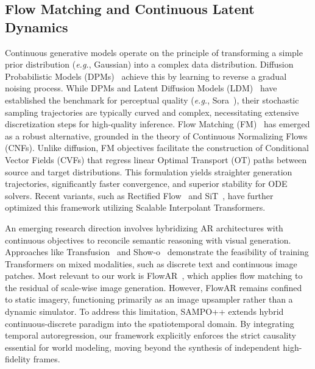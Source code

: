 \subsection{Flow Matching and Continuous Latent Dynamics}
Continuous generative models operate on the principle of transforming a simple prior distribution (\textit{e.g.}, Gaussian) into a complex data distribution. Diffusion Probabilistic Models (DPMs)~\cite{ho2020denoising, song2020score} achieve this by learning to reverse a gradual noising process. While DPMs and Latent Diffusion Models (LDM)~\cite{rombach2022high} have established the benchmark for perceptual quality (\textit{e.g.}, Sora~\cite{liu2024sora}), their stochastic sampling trajectories are typically curved and complex, necessitating extensive discretization steps for high-quality inference. Flow Matching (FM)~\cite{lipman2023flow, liuflow, albergo2025stochastic,wang2025flowram} has emerged as a robust alternative, grounded in the theory of Continuous Normalizing Flows (CNFs). Unlike diffusion, FM objectives facilitate the construction of Conditional Vector Fields (CVFs) that regress linear Optimal Transport (OT) paths between source and target distributions. This formulation yields straighter generation trajectories, significantly faster convergence, and superior stability for ODE solvers. Recent variants, such as Rectified Flow~\cite{liuflow} and SiT~\cite{ma2024sit}, have further optimized this framework utilizing Scalable Interpolant Transformers.

An emerging research direction involves hybridizing AR architectures with continuous objectives to reconcile semantic reasoning with visual generation. Approaches like Transfusion~\cite{zhou2024transfusion} and Show-o~\cite{xie2024show} demonstrate the feasibility of training Transformers on mixed modalities, such as discrete text and continuous image patches. Most relevant to our work is FlowAR~\cite{ren2024flowar}, which applies flow matching to the residual of scale-wise image generation. However, FlowAR remains confined to static imagery, functioning primarily as an image upsampler rather than a dynamic simulator. To address this limitation, SAMPO++ extends hybrid continuous-discrete paradigm into the spatiotemporal domain. By integrating temporal autoregression, our framework explicitly enforces the strict causality essential for world modeling, moving beyond the synthesis of independent high-fidelity frames.


